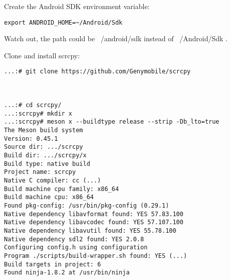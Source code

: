 Create the Android SDK environment variable:
\begin{lstlisting}
export ANDROID_HOME=~/Android/Sdk
\end{lstlisting}

Watch out, the path could be ~/android/sdk instead of ~/Android/Sdk	.


Clone and install scrcpy:
\begin{lstlisting}
...:# git clone https://github.com/Genymobile/scrcpy



...:# cd scrcpy/
...:scrcpy# mkdir x
...:scrcpy# meson x --buildtype release --strip -Db_lto=true
The Meson build system
Version: 0.45.1
Source dir: .../scrcpy
Build dir: .../scrcpy/x
Build type: native build
Project name: scrcpy
Native C compiler: cc (...)
Build machine cpu family: x86_64
Build machine cpu: x86_64
Found pkg-config: /usr/bin/pkg-config (0.29.1)
Native dependency libavformat found: YES 57.83.100
Native dependency libavcodec found: YES 57.107.100
Native dependency libavutil found: YES 55.78.100
Native dependency sdl2 found: YES 2.0.8
Configuring config.h using configuration
Program ./scripts/build-wrapper.sh found: YES (...)
Build targets in project: 6
Found ninja-1.8.2 at /usr/bin/ninja
\end{lstlisting}			
				
				